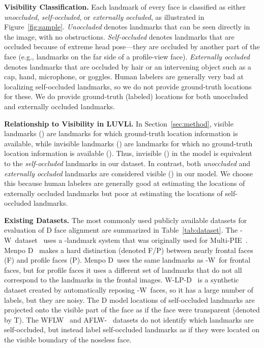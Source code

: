 \documentclass[10pt,twocolumn,letterpaper]{article}
\newcommand{\example}{{e.g.}}
\newcommand{\threehundredW}{-W}
\newcommand{\threehundredLP}{W-LP-D}
\newcommand{\menpoTwoD}{Menpo D}
\newcommand{\1}{{\bf 1}}
\newcommand{\0}{{\bf 0}}
\begin{document}
\textbf{Visibility Classification.}
    Each landmark of every face is classified as either \emph{unoccluded}, \emph{self-occluded}, or \emph{externally occluded}, as illustrated in Figure~\ref{fig:sample}. \emph{Unoccluded} denotes landmarks that can be seen directly in the image, with no obstructions. \emph{Self-occluded} denotes landmarks that are occluded because of extreme head pose---they are occluded by another part of the face (\example, landmarks on the far side of a profile-view face). \emph{Externally occluded} denotes landmarks that are occluded by hair or an intervening object such as a cap, hand, microphone, or goggles. Human labelers are generally very bad at localizing self-occluded landmarks, so we do not provide ground-truth locations for these. We do provide ground-truth (labeled) locations for both unoccluded and externally occluded landmarks.


\textbf{Relationship to Visibility in LUVLi.} 
    In Section~\ref{sec:method}, visible landmarks () are landmarks for which ground-truth location information is available, while invisible landmarks () are landmarks for which no ground-truth location information is available (). Thus, invisible () in the model is equivalent to the \emph{self-occluded} landmarks in our dataset. In contrast, both \emph{unoccluded} and \emph{externally occluded} landmarks are considered visible () in our model. We choose this because human labelers are generally good at estimating the locations of externally occluded landmarks but poor at estimating the locations of self-occluded landmarks.
    
    
\textbf{Existing Datasets.}
    The most commonly used publicly available datasets for evaluation of D face alignment are summarized in Table~\ref{tab:dataset}. The \threehundredW~dataset~\cite{sagonas2013300, sagonas2016300, sagonas2013semi} uses a -landmark system that was originally used for Multi-PIE~\cite{gross2010multi}. \menpoTwoD~\cite{zafeiriou2017menpo, trigeorgis2016mnemonic, deng2019menpo} makes a hard distinction (denoted F/P) between nearly frontal faces (F) and profile faces (P). \menpoTwoD~uses the same landmarks as \threehundredW~for frontal faces, but for profile faces it uses a different set of  landmarks that do not all correspond to the  landmarks in the frontal images. \threehundredLP~\cite{zhu2016face,bulat2017far} is a synthetic dataset created by automatically reposing \threehundredW~faces, so it has a large number of labels, but they are noisy. The D model locations of self-occluded landmarks are projected onto the visible part of the face as if the face were transparent (denoted by T). The WFLW~\cite{wu2018look} and AFLW-~\cite{qian2019aggregation} datasets do not identify which landmarks are self-occluded, but instead label self-occluded landmarks as if they were located on the visible boundary of the noseless face. 
    
\end{document}
